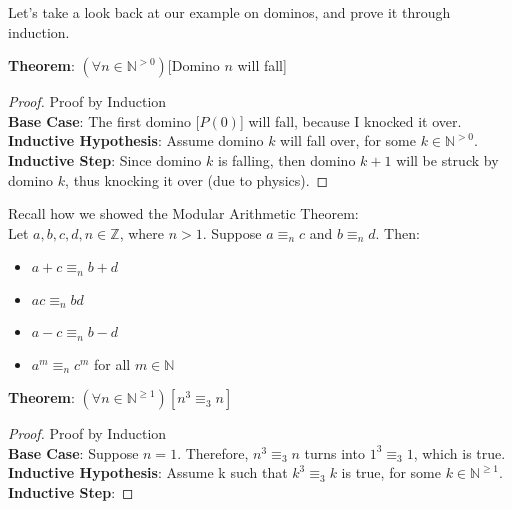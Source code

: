 Let's take a look back at our example on dominos, and prove it through induction.

\begin{example}
	\textbf{Theorem}: $(\forall n \in \mathbb{N}^{>0})[$Domino $n$ will fall]
\end{example}

\begin{proof}
	Proof by Induction\\
	\textbf{Base Case}: The first domino [$P(0)$] will fall, because I knocked it over.\\
	\textbf{Inductive Hypothesis}: Assume domino $k$ will fall over, for some $k \in \mathbb{N}^{>0}$.\\
	\textbf{Inductive Step}: Since domino $k$ is falling, then domino $k+1$ will be struck by domino $k$, thus knocking it over (due to physics).
\end{proof}

Recall how we showed the Modular Arithmetic Theorem:\\

Let $a,b,c,d,n \in \mathbb{Z}$, where $n > 1$. Suppose $a \equiv_n c$ and $b \equiv_n d$. Then:

\begin{itemize}
	\item $a+c \equiv_n b+d$
	\item $ac \equiv_n bd$
	\item $a-c \equiv_n b-d$
	\item $a^m \equiv_n c^m$ for all $m \in \mathbb{N}$
\end{itemize}

\begin{example}
	\textbf{Theorem}: $(\forall n \in \mathbb{N}^{\geq 1})[n^3 \equiv_3 n]$
\end{example}

\begin{proof}
	Proof by Induction\\
	\textbf{Base Case}: Suppose $n=1$. Therefore, $n^3 \equiv_3 n$ turns into $1^3 \equiv_3 1$, which is true.
	\textbf{Inductive Hypothesis}: Assume k such that $k^3 \equiv_3 k$ is true, for some $k \in \mathbb{N}^{\geq 1}$.
	\textbf{Inductive Step}:
\end{proof}




